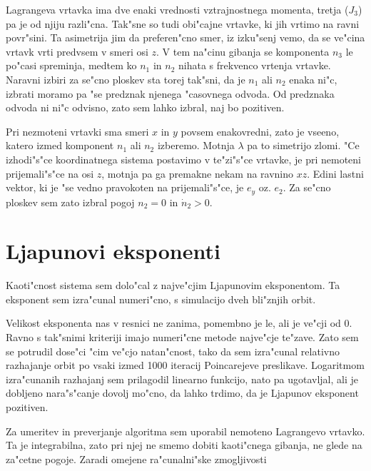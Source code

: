 \documentclass[a4paper,10pt]{article}
\begin{document}
Lagrangeva vrtavka ima dve enaki vrednosti vztrajnostnega momenta, tretja ($J_3$) pa je od njiju razli"cna. Tak"sne so tudi obi"cajne vrtavke, ki jih vrtimo na ravni povr"sini. Ta asimetrija jim da preferen"cno smer, iz izku"senj vemo, da se ve"cina vrtavk vrti predvsem v smeri osi $z$. V tem na"cinu gibanja se komponenta $n_3$ le po"casi spreminja, medtem ko $n_1$ in $n_2$ nihata s frekvenco vrtenja vrtavke. Naravni izbiri za se"cno ploskev sta torej tak"sni, da je $n_1$ ali $n_2$ enaka ni"c, izbrati moramo pa "se predznak njenega "casovnega odvoda. Od predznaka odvoda ni ni"c odvisno, zato sem lahko izbral, naj bo pozitiven. 

Pri nezmoteni vrtavki sma smeri $x$ in $y$ povsem enakovredni, zato je vseeno, katero izmed komponent $n_1$ ali $n_2$ izberemo. Motnja $\lambda$ pa to simetrijo zlomi. "Ce izhodi"s"ce koordinatnega sistema postavimo v te"zi"s"ce vrtavke, je pri nemoteni prijemali"s"ce na osi $z$, motnja pa ga premakne nekam na ravnino $xz$. Edini lastni vektor, ki je "se vedno pravokoten na prijemali"s"ce, je $e_y$ oz. $e_2$. Za se"cno ploskev sem zato izbral pogoj $n_2 = 0$ in $\dot n_2 > 0$. 

\section{Ljapunovi eksponenti}

Kaoti"cnost sistema sem dolo"cal z najve"cjim Ljapunovim eksponentom. Ta eksponent sem izra"cunal numeri"cno, s simulacijo dveh bli"znjih orbit. 

Velikost eksponenta nas v resnici ne zanima, pomembno je le, ali je ve"cji od 0. Ravno s tak"snimi kriteriji imajo numeri"cne metode najve"cje te"zave. Zato sem se potrudil dose"ci "cim ve"cjo natan"cnost, tako da sem izra"cunal relativno razhajanje orbit po vsaki izmed 1000 iteracij Poincarejeve preslikave. Logaritmom izra"cunanih razhajanj sem prilagodil linearno funkcijo, nato pa ugotavljal, ali je dobljeno nara"s"canje dovolj mo"cno, da lahko trdimo, da je Ljapunov eksponent pozitiven. 

Za umeritev in preverjanje algoritma sem uporabil nemoteno Lagrangevo vrtavko. Ta je integrabilna, zato pri njej ne smemo dobiti kaoti"cnega gibanja, ne glede na za"cetne pogoje. Zaradi omejene ra"cunalni"ske zmogljivosti
\end{document}

